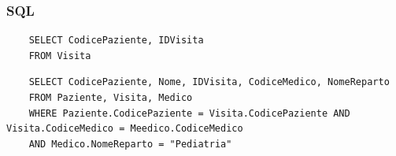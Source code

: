 \documentclass{article}
\begin{document}
	\subsubsection{SQL}
	\begin{verbatim}
	SELECT CodicePaziente, IDVisita
	FROM Visita
	\end{verbatim}
	\begin{verbatim}
	SELECT CodicePaziente, Nome, IDVisita, CodiceMedico, NomeReparto
	FROM Paziente, Visita, Medico
	WHERE Paziente.CodicePaziente = Visita.CodicePaziente AND Visita.CodiceMedico = Meedico.CodiceMedico
	AND Medico.NomeReparto = "Pediatria"
	\end{verbatim}
\end{document}
